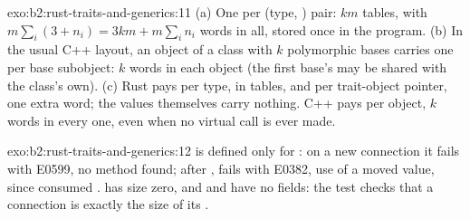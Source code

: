 \begin{solution}{exo:b2:rust-traits-and-generics:11}
(a) One  per (type, ) pair: $km$ tables, with $m \sum_i (3 + n_i) = 3km + m \sum_i n_i$ words in all,
stored once in the program. (b) In the usual C++ layout, an object of a class with $k$ polymorphic bases carries one
 per base subobject: $k$ words in each object (the first base's may be shared with the class's own).
(c) Rust pays per type, in tables, and per trait-object pointer, one extra word; the values themselves carry
nothing. C++ pays per object, $k$ words in every one, even when no virtual call is ever made.
\end{solution}

\begin{solution}{exo:b2:rust-traits-and-generics:12}
 is defined only for : on a new connection it fails with E0599, no
method found; after ,  fails with E0382, use of a moved
value, since  consumed .  has size zero, and  and
 have no fields: the test checks that a connection is exactly the size of its .
\end{solution}

